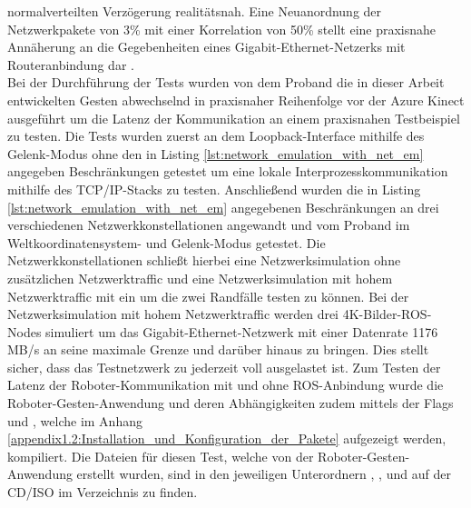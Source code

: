 normalverteilten Verzögerung realitätsnah. Eine Neuanordnung der Netzwerkpakete von 3\% mit einer Korrelation von 50\% stellt eine praxisnahe Annäherung an die Gegebenheiten eines Gigabit-Ethernet-Netzerks mit Routeranbindung dar \cite{admin_understanding_2018}.\\

Bei der Durchführung der Tests wurden von dem Proband die in dieser Arbeit entwickelten Gesten abwechselnd in praxisnaher Reihenfolge vor der Azure Kinect ausgeführt um die Latenz der Kommunikation an einem praxisnahen Testbeispiel zu testen. Die Tests wurden zuerst an dem Loopback-Interface mithilfe des Gelenk-Modus ohne den in Listing \ref{lst:network_emulation_with_net_em} angegeben Beschränkungen getestet um eine lokale Interprozesskommunikation mithilfe des TCP/IP-Stacks zu testen. Anschließend wurden die in Listing \ref{lst:network_emulation_with_net_em} angegebenen Beschränkungen an drei verschiedenen Netzwerkkonstellationen angewandt und vom Proband im Weltkoordinatensystem- und Gelenk-Modus getestet. Die Netzwerkkonstellationen schließt hierbei eine Netzwerksimulation ohne zusätzlichen Netzwerktraffic und eine Netzwerksimulation mit hohem Netzwerktraffic mit ein um die zwei Randfälle testen zu können. Bei der Netzwerksimulation mit hohem Netzwerktraffic werden drei 4K-Bilder-ROS-Nodes simuliert um das Gigabit-Ethernet-Netzwerk mit einer Datenrate 1176 MB/s an seine maximale Grenze und darüber hinaus zu bringen. Dies stellt sicher, dass das Testnetzwerk zu jederzeit voll ausgelastet ist. Zum Testen der Latenz der Roboter-Kommunikation mit und ohne ROS-Anbindung wurde die Roboter-Gesten-Anwendung und deren Abhängigkeiten zudem mittels der Flags  und , welche im Anhang \ref{appendix1.2:Installation_und_Konfiguration_der_Pakete} aufgezeigt werden, kompiliert. Die Dateien für diesen Test, welche von der Roboter-Gesten-Anwendung erstellt wurden, sind in den jeweiligen Unterordnern , ,  und  auf der CD/ISO im Verzeichnis  zu finden.

